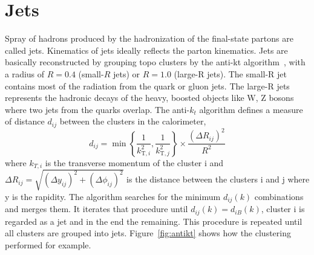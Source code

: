 \section{Jets}
Spray of hadrons produced by the hadronization of the final-state partons are called jets.
Kinematics of jets ideally reflects the parton kinematics.
Jets are basically reconstructed by grouping topo clusters by the anti-kt algorithm~\cite{Cacciari_2008}, with a radius of $R = 0.4$ (small-$R$ jets) or $R = 1.0$ (large-R jets). The small-R jet contains most of the radiation from the quark or gluon jets. The large-R jets represents the hadronic decays of the heavy, boosted objects like W, Z bosons where two jets from the quarks overlap.
The anti-$k_t$ algorithm defines a measure of distance $d_{ij}$ between the clusters in the calorimeter,
\begin{equation}
d_{i j}=\min \left\{\frac{1}{k_{\mathrm{T}, i}^{2}}, \frac{1}{k_{\mathrm{T}, j}^{2}}\right\} \times \frac{\left(\Delta R_{i j}\right)^{2}}{R^{2}}
\end{equation}
where $k_{T,i}$ is the transverse momentum of the cluster i and $\Delta R_{i j}=\sqrt{\left(\Delta y_{i j}\right)^{2}+\left(\Delta \phi_{i j}\right)^{2}}$ is the distance between the clusters i and j where y is the rapidity. 
The algorithm searches for the minimum $d_{i j}(k)$ combinations and merges them. 
It iterates that procedure until $d_{i j}(k) = d_{i B}(k)$, cluster i is regarded as a jet and in the end the remaining. 
This procedure is repeated until all clusters are grouped into jets.
Figure~\ref{fig:antikt} shows how the clustering performed for example.
